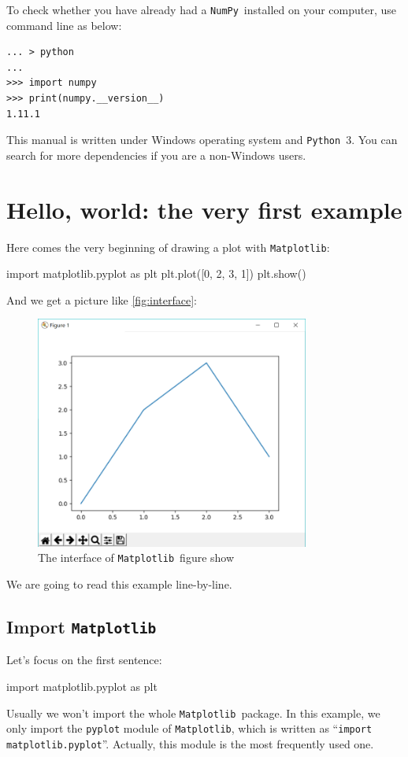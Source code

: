 \documentclass{report}
\newcommand{\pkg}[1]{\texttt{#1}}
\newcommand{\Py}{\pkg{Python}}
\newcommand{\NumPy}{\pkg{NumPy}}
\newcommand{\mpl}{\texttt{Matplotlib}}
\newcommand{\nextblock}{\vspace{2ex}}
\begin{document}
To check whether you have already had a \NumPy\ installed on your computer, use command line as below:
\begin{verbatim}
... > python
...
>>> import numpy
>>> print(numpy.__version__)
1.11.1
\end{verbatim}

\nextblock This manual is written under Windows operating system and \Py\ 3. You can search for more dependencies if you are a non-Windows users.

\section{Hello, world: the very first example}
Here comes the very beginning of drawing a plot with \mpl :
\begin{py}
import matplotlib.pyplot as plt
plt.plot([0, 2, 3, 1])
plt.show()
\end{py}

And we get a picture like \autoref{fig:interface}:

\begin{figure}[!htb]
  \centering
  \includegraphics[width=90mm]{Example-Interface.png}
  \caption{The interface of \mpl\ figure show}
  \label{fig:interface}
\end{figure}

We are going to read this example line-by-line.

\subsection{Import \mpl}
Let's focus on the first sentence:
\begin{py}
import matplotlib.pyplot as plt
\end{py}

Usually we won't import the whole \mpl\ package. In this example, we only import the \texttt{pyplot} module of \mpl , which is written as ``\texttt{import matplotlib.pyplot}''. Actually, this module is the most frequently used one. 
\end{document}
